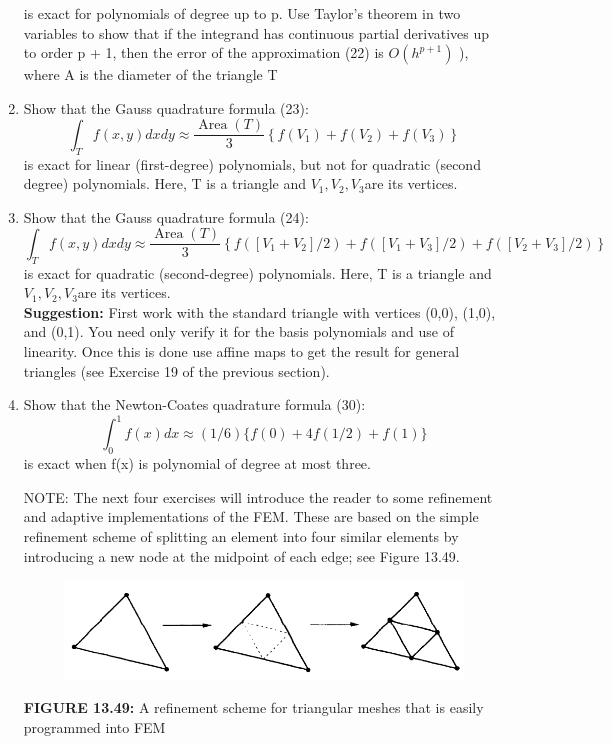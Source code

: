\documentclass[../main.tex]{subfiles}
\begin{document}
\begin{enumerate}
$$$$
is exact for polynomials of degree up to p. Use Taylor's theorem in two variables to show that 
if the integrand has continuous partial derivatives up to order p + 1, then the error of the 
approximation (22) is $O(h^{p+1})$
), where A is the diameter of the triangle T
	\item Show that the Gauss quadrature formula (23):
	$$
\int_{T} f(x, y) d x d y \approx \frac{\operatorname{Area}(T)}{3}\left\{f\left(V_{1}\right)+f\left(V_{2}\right)+f\left(V_{3}\right)\right\}
$$
is exact for linear (first-degree) polynomials, but not for quadratic (second degree) polynomials. 
Here, T is a triangle and $V_1, V_2, V_3 $are its vertices.
	\item Show that the Gauss quadrature formula (24): 
	$$
\int_{T} f(x, y) d x d y \approx \frac{\operatorname{Area}(T)}{3}\left\{f\left(\left[V_{1}+V_{2}\right] / 2\right)+f\left(\left[V_{1}+V_{3}\right] / 2\right)+f\left(\left[V_{2}+V_{3}\right] / 2\right)\right\}
$$
is exact for quadratic (second-degree) polynomials. Here, T is a triangle and $V_1, V_2, V_3 $are its 
vertices. \\
\textbf{Suggestion:} First work with the standard triangle with vertices (0,0), (1,0), and (0,1). You 
need only verify it for the basis polynomials and use of linearity. Once this is done use affine 
maps to get the result for general triangles (see Exercise 19 of the previous section).
	\item Show that the Newton-Coates quadrature formula (30): 
	$$
\int_{0}^{1} f(x) d x \approx(1 / 6)\{f(0)+4 f(1 / 2)+f(1)\}
$$
is exact when f(x) is polynomial of degree at most three. 
	\item[NOTE:]The next four exercises will introduce the reader to some refinement and adaptive 
implementations of the FEM. These are based on the simple refinement scheme of splitting an element 
into four similar elements by introducing a new node at the midpoint of each edge; see Figure 13.49. 
\begin{figure}[H]
\includegraphics[width=0.9\linewidth]{36}
	\centering
	\label{pfig:ch13_36}
\end{figure}
\textbf{FIGURE 13.49:} A refinement scheme for triangular meshes that is easily programmed into FEM 

\end{enumerate}
\end{document}
